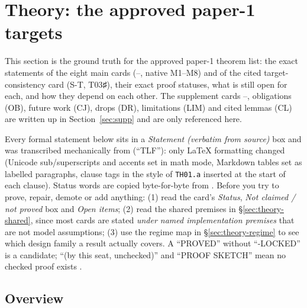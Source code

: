 \section{Theory: the approved paper-1 targets}\label{sec:theory}
\sloppy

This section is the ground truth for the approved paper-1 theorem list: the exact statements of the eight main cards (–, native M1–M8) and of the cited target-consistency card  (S-T, T03♯), their exact proof statuses, what is still open for each, and how they depend on each other. The supplement cards –, obligations (OB), future work (CJ), drops (DR), limitations (LIM) and cited lemmas (CL) are written up in Section~\ref{sec:supp} and are only referenced here.

\begin{agentnote}
Every formal statement below sits in a \emph{Statement (verbatim from source)} box and was transcribed mechanically from  (``TLF''): only LaTeX formatting changed (Unicode sub/superscripts and accents set in math mode, Markdown tables set as labelled paragraphs, clause tags in the style of \texttt{TH01.a} inserted at the start of each clause). Status words are copied byte-for-byte from . Before you try to prove, repair, demote or add anything: (1) read the card's \emph{Status}, \emph{Not claimed / not proved} box and \emph{Open items}; (2) read the shared premises in §\ref{sec:theory-shared}, since most cards are stated \emph{under named implementation premises} that are not model assumptions; (3) use the regime map in §\ref{sec:theory-regime} to see which design family a result actually covers. A ``PROVED'' without ``-LOCKED'' is a candidate; ``(by this seat, unchecked)'' and ``PROOF SKETCH'' mean no checked proof exists .
\end{agentnote}

\subsection{Overview}\label{sec:theory-overview}


